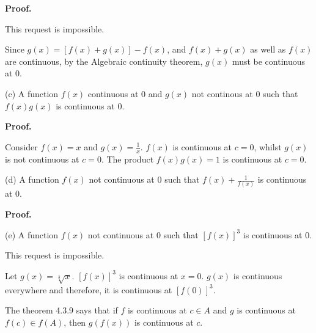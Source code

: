 \documentclass[10pt]{article}
\begin{document}
\textbf{Proof.}



This request is impossible.



Since $\displaystyle g( x) =[ f( x) +g( x)] -f( x)$, and $\displaystyle f( x) +g( x)$ as well as $\displaystyle f( x)$ are continuous, by the Algebraic continuity theorem, $\displaystyle g( x)$ must be continuous at $\displaystyle 0$.



(c) A function $\displaystyle f( x)$ continuous at $\displaystyle 0$ and $\displaystyle g( x)$ not continous at $\displaystyle 0$ such that $\displaystyle f( x) g( x)$ is continuous at $\displaystyle 0$. 



\textbf{Proof.}



Consider $\displaystyle f( x) =x$ and $\displaystyle g( x) =\frac{1}{x}$. $\displaystyle f( x)$ is continuous at $\displaystyle c=0$, whilst $\displaystyle g( x)$ is not continuous at $\displaystyle c=0$. The product $\displaystyle f( x) g( x) =1$ is continuous at $\displaystyle c=0$.



(d) A function $\displaystyle f( x)$ not continuous at $\displaystyle 0$ such that $\displaystyle f( x) +\frac{1}{f( x)}$ is continuous at $\displaystyle 0$.







\textbf{Proof.}



(e) A function $\displaystyle f( x)$ not continuous at $\displaystyle 0$ such that $\displaystyle [ f( x)]^{3}$ is continuous at $\displaystyle 0$.



This request is impossible.



Let $\displaystyle g( x) =\sqrt[3] x$. $\displaystyle [ f( x)]^{3}$ is continuous at $\displaystyle x=0$. $\displaystyle g( x)$ is continuous everywhere and therefore, it is continuous at $\displaystyle [ f( 0)]^{3}$. 



The theorem 4.3.9 says that if $\displaystyle f$ is continuous at $\displaystyle c\in A$ and $\displaystyle g$ is continuous at $\displaystyle f( c) \in f( A)$, then $\displaystyle g( f( x))$ is continuous at $\displaystyle c$.
\end{document}
